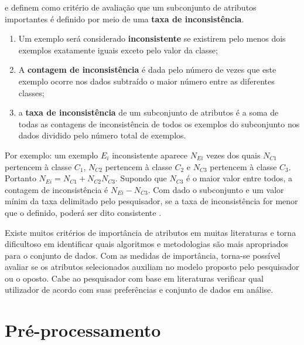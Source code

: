 \documentclass[
  openany]{book}
\begin{document}
\citet{dash2003consistency} e \citet{liu1996probabilistic} definem como critério de avaliação que um subconjunto de atributos importantes é definido por meio de uma \textbf{taxa de inconsistência}.

\begin{enumerate}
\def\labelenumi{\arabic{enumi}.}
\item
  Um exemplo será considerado \textbf{inconsistente} se existirem pelo menos dois exemplos exatamente iguais exceto pelo valor da classe;
\item
  A \textbf{contagem de inconsistência} é dada pelo número de vezes que este exemplo ocorre nos dados subtraído o maior número entre as diferentes classes;
\item
  a \textbf{taxa de inconsistência} de um subconjunto de atributos é a soma de todas as contagens de inconsistência de todos os exemplos do subconjunto nos dados dividido pelo número total de exemplos.
\end{enumerate}

Por exemplo: um exemplo \(E_i\) inconsistente aparece \(N_{Ei}\) vezes dos quais \(N_{C1}\) pertencem à classe \(C_1\), \(N_{C2}\) pertencem à classe \(C_2\) e \(N_{C3}\) pertencem à classe \(C_3\). Portanto \(N_{Ei}=N_{C1}+N_{C2}N_{C3}\). Supondo que \(N_{C3}\) é o maior valor entre todos, a contagem de inconsistência é \(N_{Ei}-N_{C3}\). Com dado o subconjunto e um valor mínim da taxa delimitado pelo pesquisador, se a taxa de inconsistência for menor que o definido, poderá ser dito consistente \citep{lee2005seleccao}.

Existe muitos critérios de importância de atributos em muitas literaturas e torna dificultoso em identificar quais algoritmos e metodologias são mais apropriados para o conjunto de dados. Com as medidas de importância, torna-se possível avaliar se os atributos selecionados auxiliam no modelo proposto pelo pesquisador ou o oposto. Cabe ao pesquisador com base em literaturas verificar qual utilizador de acordo com suas preferências e conjunto de dados em análise.

\hypertarget{preprocesso}{%
\chapter{Pré-processamento}\label{preprocesso}}
\end{document}
